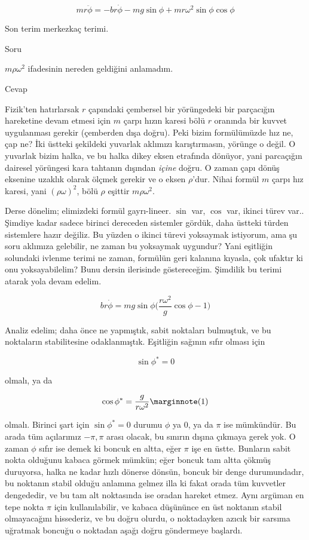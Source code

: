 \documentclass[12pt,fleqn]{article}\usepackage{../../common}
\begin{document}
$$ mr\ddot{\phi} = -br\dot{\phi} - mg\sin\phi + mr\omega^2\sin\phi\cos\phi $$

Son terim merkezkaç terimi.

Soru

$m\rho\omega^2$ ifadesinin nereden geldiğini anlamadım.

Cevap

Fizik'ten hatırlarsak $r$ çapındaki çembersel bir yörüngedeki bir parçacığın
hareketine devam etmesi için $m$ çarpı hızın karesi bölü $r$ oranında bir kuvvet
uygulanması gerekir (çemberden dışa doğru). Peki bizim formülümüzde hız ne, çap
ne? İki üstteki şekildeki yuvarlak aklımızı karıştırmasın, yörünge o değil. O
yuvarlak bizim halka, ve bu halka dikey eksen etrafında dönüyor, yani parcaçığın
dairesel yörüngesi kara tahtanın dışından {\em içine} doğru. O zaman çapı dönüş
eksenine uzaklık olarak ölçmek gerekir ve o eksen $\rho$'dur. Nihai formül $m$
çarpı hız karesi, yani $(\rho\omega)^2$, bölü $\rho$ eşittir $m\rho\omega^2$.

Derse dönelim; elimizdeki formül gayrı-lineer. $\sin$ var, $\cos$ var, ikinci
türev var.. Şimdiye kadar sadece birinci dereceden sistemler gördük, daha
üstteki türden sistemlere hazır değiliz. Bu yüzden o ikinci türevi yoksaymak
istiyorum, ama şu soru aklımıza gelebilir, ne zaman bu yoksaymak uygundur? Yani
eşitliğin solundaki ivlenme terimi ne zaman, formülün geri kalanına kıyasla,
çok ufaktır ki onu yoksayabilelim? Bunu dersin ilerisinde göstereceğim. Şimdilik
bu terimi atarak yola devam edelim.

$$ br\dot{\phi} = mg\sin\phi \bigg(
\frac{r\omega^2}{g} \cos\phi - 1
\bigg)
$$

Analiz edelim; daha önce ne yapmıştık, sabit noktaları bulmuştuk, ve bu
noktaların stabilitesine odaklanmıştık. Eşitliğin sağının sıfır olması için

$$ \sin\phi^* = 0 $$

olmalı, ya da

$$ \cos\phi^* = \frac{g}{r\omega^2} \mlabel{1}$$


olmalı. Birinci şart için $\sin\phi^* = 0$ durumu $\phi$ ya 0, ya da $\pi$ ise
mümkündür. Bu arada tüm açılarımız $-\pi,\pi$ arası olacak, bu sınırın dışına
çıkmaya gerek yok. O zaman $\phi$ sıfır ise demek ki boncuk en altta, eğer $\pi$
işe en üstte. Bunların sabit nokta olduğunu kabaca görmek mümkün; eğer boncuk
tam altta çökmüş duruyorsa, halka ne kadar hızlı dönerse dönsün, boncuk bir
denge durumundadır, bu noktanın stabil olduğu anlamına gelmez illa ki fakat
orada tüm kuvvetler dengededir, ve bu tam alt noktasında ise oradan hareket
etmez. Aynı argüman en tepe nokta $\pi$ için kullanılabilir, ve kabaca düşününce
en üst noktanın stabil olmayacağını hissederiz, ve bu doğru olurdu, o
noktadayken azıcık bir sarsıma uğratmak boncuğu o noktadan aşağı doğru
göndermeye başlardı. 
\end{document}
